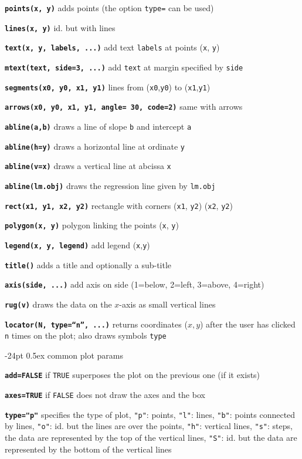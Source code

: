 \documentclass[8pt,landscape]{article}
\makeatletter
\renewcommand\section{\@startsection{section}{1}{0mm}%
                                     {-24pt}%
                                     {0.5ex}%
                                {\color{blue}\normalfont\large\bfseries}}
\newcommand{\code}{\texttt}
\newcommand{\bcode}[1]{\texttt{\textbf{#1}}}
\newcommand\F{\code{FALSE}}
\newcommand\T{\code{TRUE}}
\makeatother
\begin{document}
\begin{multicols*}{3}
\bcode{points(x, y)}  adds points (the option \code{type=} can be used)

\bcode{lines(x, y)}  id. but with lines

\bcode{text(x, y, labels, ...)}  add  text \code{labels} at points (\code{x}, \code{y})

\bcode{mtext(text, side=3, ...)}  add \code{text} at margin specified by \code{side}

\bcode{segments(x0, y0, x1, y1)}  lines from (\code{x0},\code{y0}) to (\code{x1},\code{y1})

\bcode{arrows(x0, y0, x1, y1, angle= 30, code=2)}  same with arrows 

\bcode{abline(a,b)}  draws a line of slope \code{b} and intercept \code{a}

\bcode{abline(h=y)}  draws a horizontal line at ordinate \code{y}

\bcode{abline(v=x)}  draws a vertical line at abcissa \code{x}

\bcode{abline(lm.obj)}  draws the regression line given by \code{lm.obj}

\bcode{rect(x1, y1, x2, y2)}  rectangle with corners (\code{x1}, \code{y2}) (\code{x2}, \code{y2})

\bcode{polygon(x, y)}  polygon linking the points (\code{x}, \code{y})

\bcode{legend(x, y, legend)}  add legend (\code{x},\code{y})

\bcode{title()}  adds a title and optionally a sub-title

\bcode{axis(side, ...)}  add axis on side (1=below, 2=left, 3=above, 4=right)

\bcode{rug(v)}  draws the data on the $x$-axis as small vertical lines

\bcode{locator(N, type=``n'', ...)}  returns coordinates ($x,y$) after the user has clicked \code{n} times on the plot; also draws symbols \code{type}



\section{common plot params}

\bcode{add=FALSE}  if \T{} superposes the plot on the previous one (if it exists)

\bcode{axes=TRUE}  if \F{} does not draw the axes and the box

\bcode{type="p"}  specifies the type of plot, \code{"p"}: points, \code{"l"}: lines, \code{"b"}: points connected by lines, \code{"o"}: id. but the lines are over the points, \code{"h"}: vertical lines, \code{"s"}: steps, the data are represented by the top of the vertical lines, \code{"S"}: id. but the data are represented by the bottom of the vertical lines


\end{multicols*}
\end{document}
